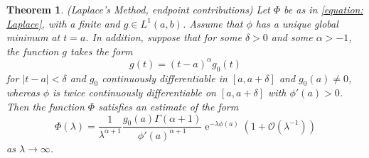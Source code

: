 \documentclass[]{report}
\DeclareMathOperator{\ee}{e}
\newcommand{\Boh}{\mathcal{O}}
\newtheorem{thm}[lemma]{Theorem}
\numberwithin{equation}{section} %
\begin{document}
\begin{thm}
	(Laplace's Method, endpoint contributions) Let $\Phi$ be as in \ref{equation: Laplace}, with a finite and $g \in L^1(a,b)$. Assume that $\phi$ has a unique global minimum at $t=a$. In addition, suppose that for some $\delta > 0$ and some $\alpha > -1$, the function $g$ takes the form
	$$ g(t) = (t-a)^{\alpha} g_0(t)$$
	for $|t-a| < \delta$ and $g_0$ continuously differentiable in $[a, a+\delta]$ and $g_0(a) \neq 0$, whereas $\phi$ is twice continuously differentiable on $[a, a+\delta]$ with $\phi'(a) > 0$. Then the function $\Phi$ satisfies an estimate of the form
	\begin{equation}
		\Phi(\lambda) = \frac{1}{\lambda^{\alpha + 1}} \frac{g_0(a) \Gamma(\alpha + 1)}{\phi'(a)^{\alpha + 1}} \ee^{-\lambda \phi(a)} \left(1+\Boh(\lambda^{-1})\right)
	\end{equation}
	as $\lambda \rightarrow \infty$.
\end{thm}
\end{document}
